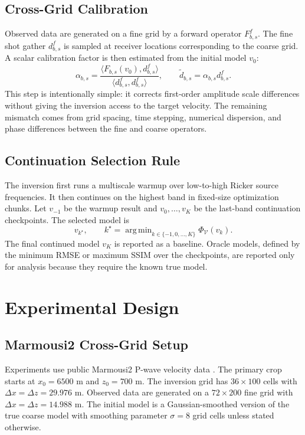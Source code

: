 \documentclass[10pt,twocolumn]{article}
\DeclareMathOperator*{\argmin}{arg\,min}
\newcommand{\misfit}{\Phi}
\begin{document}
\subsection{Cross-Grid Calibration}
Observed data are generated on a fine grid by a forward operator
$F^f_{b,s}$. The fine shot gather $d^f_{b,s}$ is sampled at receiver
locations corresponding to the coarse grid. A scalar calibration factor is
then estimated from the initial model $v_0$:
\begin{equation}
  \alpha_{b,s}
  = \frac{\langle F_{b,s}(v_0), d^f_{b,s}\rangle}
         {\langle d^f_{b,s}, d^f_{b,s}\rangle},
  \qquad
  \tilde d_{b,s} = \alpha_{b,s} d^f_{b,s}.
  \label{eq:calibration}
\end{equation}
This step is intentionally simple: it corrects first-order amplitude scale
differences without giving the inversion access to the target velocity.
The remaining mismatch comes from grid spacing, time stepping, numerical
dispersion, and phase differences between the fine and coarse operators.

\subsection{Continuation Selection Rule}
The inversion first runs a multiscale warmup over low-to-high Ricker
source frequencies. It then continues on the highest band in fixed-size
optimization chunks. Let $v_{-1}$ be the warmup result and
$v_0,\ldots,v_K$ be the last-band continuation checkpoints. The selected
model is
\begin{equation}
  v_{k^\star},\qquad
  k^\star = \argmin_{k\in\{-1,0,\ldots,K\}}
            \misfit_{\mathcal{V}}(v_k).
  \label{eq:selection}
\end{equation}
The final continued model $v_K$ is reported as a baseline. Oracle models,
defined by the minimum RMSE or maximum SSIM over the checkpoints, are
reported only for analysis because they require the known true model.

\section{Experimental Design}
\subsection{Marmousi2 Cross-Grid Setup}
Experiments use public Marmousi2 P-wave velocity data
\cite{martin2006marmousi2}. The primary crop starts at
$x_0=6500$ m and $z_0=700$ m. The inversion grid has
$36\times100$ cells with $\Delta x=\Delta z=29.976$ m. Observed data are
generated on a $72\times200$ fine grid with $\Delta x=\Delta z=14.988$ m.
The initial model is a Gaussian-smoothed version of the true coarse model
with smoothing parameter $\sigma=8$ grid cells unless stated otherwise.
\end{document}
